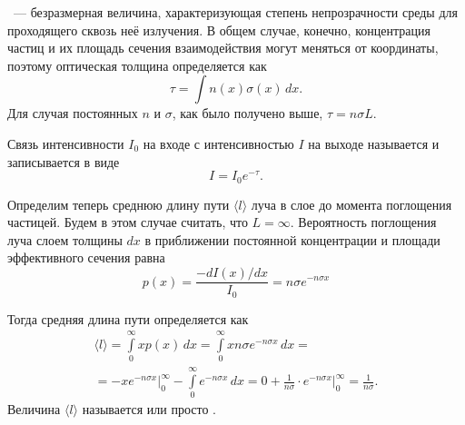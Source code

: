 ~--- безразмерная величина, характеризующая степень непрозрачности среды для проходящего сквозь неё излучения. В общем случае, конечно, концентрация частиц и их площадь сечения взаимодействия могут меняться от координаты, поэтому оптическая толщина определяется как
\begin{equation}
	\tau = \int n(x) \sigma(x) \,d x.
\end{equation}
Для случая постоянных $n$ и $\sigma$, как было получено выше, $\tau = n \sigma L$.

Связь интенсивности $I_0$ на входе с интенсивностью $I$ на выходе называется  и записывается в виде
\begin{equation}
	I = I_0 e^{-\tau}.
\end{equation}

Определим теперь среднюю длину пути $\langle l \rangle$ луча в слое до момента поглощения частицей. Будем в этом случае считать, что $L = \infty$. Вероятность поглощения луча слоем толщины $dx$ в приближении постоянной концентрации и площади эффективного сечения равна
\begin{equation*}
	p(x) = \frac{-dI(x) / dx}{I_0} = n \sigma e^{-n\sigma x}
\end{equation*}

Тогда средняя длина пути определяется как
\begin{multline*}
	\langle l \rangle 
	= \int\limits_0^\infty x p(x) \,d x 
	= \int\limits_0^\infty x n \sigma e^{-n\sigma x} \,d x =\\
	= - x e^{-n \sigma x}\big|_{0}^{\infty} -  \int\limits_0^\infty e^{-n\sigma x} \,d x 
	= 0 + \frac{1}{n \sigma} \cdot e^{-n \sigma x} \big|_0^\infty = \frac{1}{n \sigma}.
\end{multline*}
Величина $\langle l \rangle$ называется  или просто .

